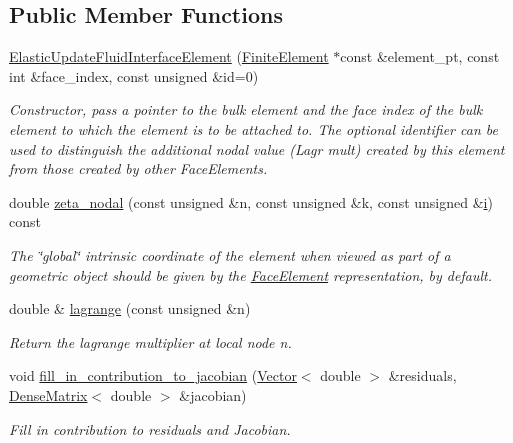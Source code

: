 \subsection*{Public Member Functions}
\begin{DoxyCompactItemize}
\item 
\hyperlink{classoomph_1_1ElasticUpdateFluidInterfaceElement_a5e5d81d8ba6c7b6567ec6d1dd42c1c96}{Elastic\+Update\+Fluid\+Interface\+Element} (\hyperlink{classoomph_1_1FiniteElement}{Finite\+Element} $\ast$const \&element\+\_\+pt, const int \&face\+\_\+index, const unsigned \&id=0)
\begin{DoxyCompactList}\small\item\em Constructor, pass a pointer to the bulk element and the face index of the bulk element to which the element is to be attached to. The optional identifier can be used to distinguish the additional nodal value (Lagr mult) created by this element from those created by other Face\+Elements. \end{DoxyCompactList}\item 
double \hyperlink{classoomph_1_1ElasticUpdateFluidInterfaceElement_a41706192ce4de3c4c51a70086199d8fa}{zeta\+\_\+nodal} (const unsigned \&n, const unsigned \&k, const unsigned \&\hyperlink{cfortran_8h_adb50e893b86b3e55e751a42eab3cba82}{i}) const
\begin{DoxyCompactList}\small\item\em The \char`\"{}global\char`\"{} intrinsic coordinate of the element when viewed as part of a geometric object should be given by the \hyperlink{classoomph_1_1FaceElement}{Face\+Element} representation, by default. \end{DoxyCompactList}\item 
double \& \hyperlink{classoomph_1_1ElasticUpdateFluidInterfaceElement_a8b5c5b703e6daafbe1dcafd3fe93e537}{lagrange} (const unsigned \&n)
\begin{DoxyCompactList}\small\item\em Return the lagrange multiplier at local node n. \end{DoxyCompactList}\item 
void \hyperlink{classoomph_1_1ElasticUpdateFluidInterfaceElement_acc1d5bb57e5664b86a9a76a4cfb8259f}{fill\+\_\+in\+\_\+contribution\+\_\+to\+\_\+jacobian} (\hyperlink{classoomph_1_1Vector}{Vector}$<$ double $>$ \&residuals, \hyperlink{classoomph_1_1DenseMatrix}{Dense\+Matrix}$<$ double $>$ \&jacobian)
\begin{DoxyCompactList}\small\item\em Fill in contribution to residuals and Jacobian. \end{DoxyCompactList}\item 

\end{DoxyCompactItemize}

